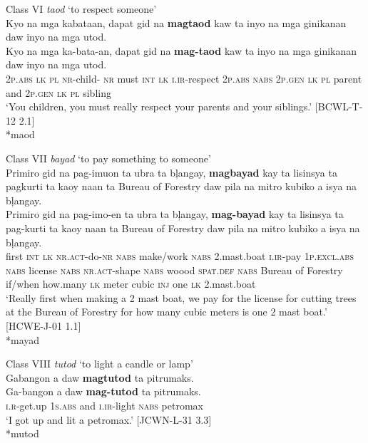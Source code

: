 \ea
Class VI \textit{taod} ‘to respect someone’ \\
Kyo  na  mga  kabataan,  dapat  gid  na  \textbf{magtaod}  kaw  ta  inyo na  mga  ginikanan  daw  inyo  na  mga  utod. \\\smallskip
\gll Kyo  na  mga  ka-bata-an,  dapat  gid  na  \textbf{mag-taod}  kaw  ta  inyo na  mga  ginikanan  daw  inyo  na  mga  utod. \\
2\textsc{p.abs}  \textsc{lk}  \textsc{pl}  \textsc{nr}-child- \textsc{nr}  must  \textsc{int}  \textsc{lk}  \textsc{i.ir}-respect  2\textsc{p.abs}  \textsc{nabs}  2\textsc{p.gen} \textsc{lk}  \textsc{pl}  parent  and  2\textsc{p.gen}  \textsc{lk}  \textsc{pl}  sibling \\
\glt ‘You children, you must really respect your parents and your siblings.’ [BCWL-T-12 2.1] \\\smallskip
*maod
\z

\ea
Class VII \textit{bayad} ‘to pay something to someone’ \\
Primiro  gid  na  pag-imuon  ta  ubra  ta  bļangay, \textbf{magbayad}  kay  ta  lisinsya  ta  pagkurti  ta  kaoy naan  ta  Bureau of Forestry  daw  pila  na  mitro  kubiko a  isya  na  bļangay. \\\smallskip
\gll Primiro  gid  na  pag-imo-en  ta  ubra  ta  bļangay, \textbf{mag-bayad}  kay  ta  lisinsya  ta  pag-kurti  ta  kaoy naan  ta  Bureau of Forestry  daw  pila  na  mitro  kubiko a  isya  na  bļangay. \\
first  \textsc{int}  \textsc{lk}  \textsc{nr.act}-do-\textsc{nr}  \textsc{nabs}  make/work  \textsc{nabs}  2.mast.boat
\textsc{i.ir}-pay  1\textsc{p.excl.abs}  \textsc{nabs}  license  \textsc{nabs}  \textsc{nr.act}-shape  \textsc{nabs}  woood
\textsc{spat.def}  \textsc{nabs}   Bureau of Forestry  if/when  how.many  \textsc{lk}  meter  cubic \textsc{inj}   one  \textsc{lk}  2.mast.boat \\
\glt ‘Really first when making a 2 mast boat, we pay for the license for cutting trees at the Bureau of Forestry for how many cubic meters is one 2 mast boat.’ [HCWE-J-01 1.1] \\\smallskip
*mayad
\z

\ea
\label{bkm:Ref150434151}
Class VIII \textit{tutod} ‘to light a candle or lamp’ \\
Gabangon   a  daw  \textbf{magtutod}  ta  pitrumaks. \\\smallskip
\gll Ga-bangon   a  daw  \textbf{mag-tutod}  ta  pitrumaks. \\
\textsc{i.r}-get.up  1\textsc{s.abs}  and  \textsc{i.ir}-light  \textsc{nabs}  petromax \\
\glt ‘I got up and lit a petromax.’ [JCWN-L-31 3.3] \\\smallskip
*mutod
\z

